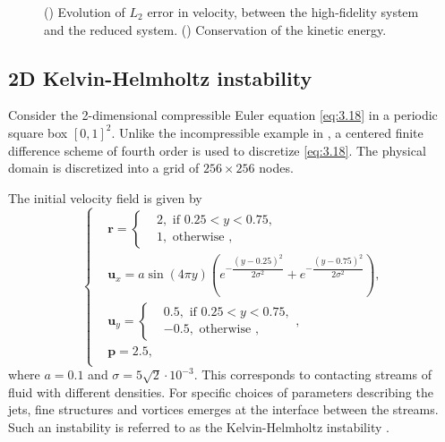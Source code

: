 \begin{figure}[t]
\begin{subfigure}[]{0.47\linewidth}
\caption{}
\label{fig:energy_error_incompressible_Euler}
\end{subfigure}
\label{fig:energy_approx_err}
\caption{(\protect{}) Evolution of $L_2$ error in velocity, between the high-fidelity system and the reduced system. (\protect{}) Conservation of the kinetic energy.}
\end{figure}


\subsection{2D Kelvin-Helmholtz instability}
Consider the 2-dimensional compressible Euler equation \eqref{eq:3.18} in a periodic square box $[0,1]^2$. Unlike the incompressible example in , a centered finite difference scheme of fourth order is used to discretize \eqref{eq:3.18}. The physical domain is discretized into a grid of $256\times 256$ nodes.

The initial velocity field is given by
\begin{equation*}
\begin{cases}
& \mathbf{r} = 
\begin{cases}
& 2, \text{ if } 0.25<y<0.75,\\
& 1, \text{ otherwise },
\end{cases}
\\
& \mathbf{u}_x = a \sin(4\pi y) \left( e^{-\dfrac{(y-0.25)^2}{2\sigma^2}} + e^{-\dfrac{(y-0.75)^2}{2\sigma^2}} \right),\\
& \mathbf{u}_y = 
\begin{cases}
& 0.5, \text{ if } 0.25<y<0.75,\\
& -0.5, \text{ otherwise },
\end{cases},
\\
& \mathbf{p} = 2.5,\\
\end{cases}
\end{equation*}
where $a=0.1$ and $\sigma=5\sqrt{2}\cdot 10^{-3}$. This corresponds to contacting streams of fluid with different densities. For specific choices of parameters describing the jets, fine structures and vortices emerges at the interface between the streams. Such an instability is referred to as the Kelvin-Helmholtz instability \cite{HHS}.

